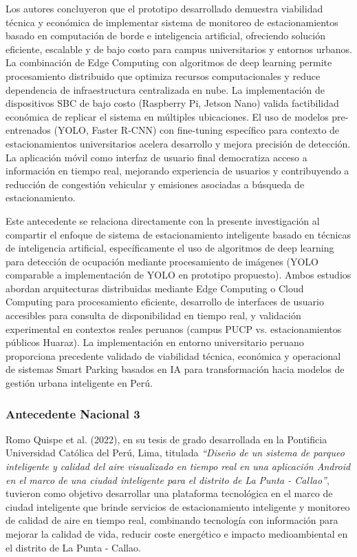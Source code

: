\documentclass[12pt,a4paper]{article}
\begin{document}
Los autores concluyeron que el prototipo desarrollado demuestra viabilidad técnica y económica de implementar sistema de monitoreo de estacionamientos basado en computación de borde e inteligencia artificial, ofreciendo solución eficiente, escalable y de bajo costo para campus universitarios y entornos urbanos. La combinación de Edge Computing con algoritmos de deep learning permite procesamiento distribuido que optimiza recursos computacionales y reduce dependencia de infraestructura centralizada en nube. La implementación de dispositivos SBC de bajo costo (Raspberry Pi, Jetson Nano) valida factibilidad económica de replicar el sistema en múltiples ubicaciones. El uso de modelos pre-entrenados (YOLO, Faster R-CNN) con fine-tuning específico para contexto de estacionamientos universitarios acelera desarrollo y mejora precisión de detección. La aplicación móvil como interfaz de usuario final democratiza acceso a información en tiempo real, mejorando experiencia de usuarios y contribuyendo a reducción de congestión vehicular y emisiones asociadas a búsqueda de estacionamiento.

Este antecedente se relaciona directamente con la presente investigación al compartir el enfoque de sistema de estacionamiento inteligente basado en técnicas de inteligencia artificial, específicamente el uso de algoritmos de deep learning para detección de ocupación mediante procesamiento de imágenes (YOLO comparable a implementación de YOLO en prototipo propuesto). Ambos estudios abordan arquitecturas distribuidas mediante Edge Computing o Cloud Computing para procesamiento eficiente, desarrollo de interfaces de usuario accesibles para consulta de disponibilidad en tiempo real, y validación experimental en contextos reales peruanos (campus PUCP vs. estacionamientos públicos Huaraz). La implementación en entorno universitario peruano proporciona precedente validado de viabilidad técnica, económica y operacional de sistemas Smart Parking basados en IA para transformación hacia modelos de gestión urbana inteligente en Perú.

\subsubsection{Antecedente Nacional 3}

Romo Quispe et al. (2022), en su tesis de grado desarrollada en la Pontificia Universidad Católica del Perú, Lima, titulada \textit{``Diseño de un sistema de parqueo inteligente y calidad del aire visualizado en tiempo real en una aplicación Android en el marco de una ciudad inteligente para el distrito de La Punta - Callao''}, tuvieron como objetivo desarrollar una plataforma tecnológica en el marco de ciudad inteligente que brinde servicios de estacionamiento inteligente y monitoreo de calidad de aire en tiempo real, combinando tecnología con información para mejorar la calidad de vida, reducir coste energético e impacto medioambiental en el distrito de La Punta - Callao.
\end{document}

